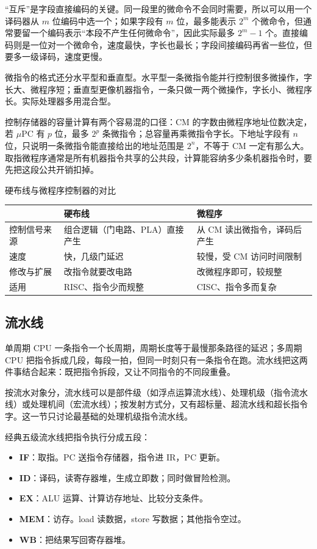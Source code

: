 “互斥”是字段直接编码的关键。同一段里的微命令不会同时需要，所以可以用一个译码器从 $m$ 位编码中选一个；如果字段有 $m$ 位，最多能表示 $2^m$ 个微命令，但通常要留一个编码表示“本段不产生任何微命令”，因此实际最多 $2^m-1$ 个。直接编码则是一位对一个微命令，速度最快，字长也最长；字段间接编码再省一些位，但要多一级译码，速度更慢。

微指令的格式还分水平型和垂直型。水平型一条微指令能并行控制很多微操作，字长大、微程序短；垂直型更像机器指令，一条只做一两个微操作，字长小、微程序长。实际处理器多用混合型。

控制存储器的容量计算有两个容易混的口径：CM 的字数由微程序地址位数决定，若 $\mu$PC 有 $p$ 位，最多 $2^p$ 条微指令；总容量再乘微指令字长。下地址字段有 $n$ 位，只说明一条微指令能直接给出的地址范围是 $2^n$，不等于 CM 一定有那么大。取指微程序通常是所有机器指令共享的公共段，计算能容纳多少条机器指令时，要先把这段公共开销扣掉。

\begin{tablebox}{硬布线与微程序控制器的对比}
\centering
\begin{tabular}{@{}p{2.6cm}p{5.2cm}p{5.2cm}@{}}
\toprule
 & 硬布线 & 微程序 \\
\midrule
控制信号来源 & 组合逻辑（门电路、PLA）直接产生 & 从 CM 读出微指令，译码后产生 \\
速度 & 快，几级门延迟 & 较慢，受 CM 访问时间限制 \\
修改与扩展 & 改指令就要改电路 & 改微程序即可，较规整 \\
适用 & RISC、指令少而规整 & CISC、指令多而复杂 \\
\bottomrule
\end{tabular}
\end{tablebox}

\subsection{流水线}

单周期 CPU 一条指令一个长周期，周期长度等于最慢那条路径的延迟；多周期 CPU 把指令拆成几段，每段一拍，但同一时刻只有一条指令在跑。流水线把这两件事结合起来：既把指令拆段，又让不同指令的不同段重叠。

按流水对象分，流水线可以是部件级（如浮点运算流水线）、处理机级（指令流水线）或处理机间（宏流水线）；按发射方式分，又有超标量、超流水线和超长指令字。这一节只讨论最基础的处理机级指令流水线。

经典五级流水线把指令执行分成五段：

\begin{itemize}
  \item \textbf{IF}：取指。PC 送指令存储器，指令进 IR，PC 更新。
  \item \textbf{ID}：译码，读寄存器堆，生成立即数；同时做冒险检测。
  \item \textbf{EX}：ALU 运算、计算访存地址、比较分支条件。
  \item \textbf{MEM}：访存。load 读数据，store 写数据；其他指令空过。
  \item \textbf{WB}：把结果写回寄存器堆。
\end{itemize}

